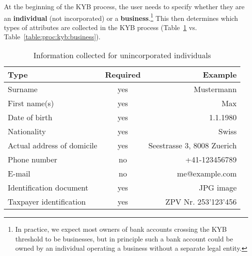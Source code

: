 At the beginning of the KYB process, the user needs to specify whether they
are an {\bf individual} (not incorporated) or a {\bf business}.\footnote{In
practice, we expect most owners of bank accounts crossing the KYB threshold to
be businesses, but in principle such a bank account could be owned by an
individual operating a business without a separate legal entity.}  This then
determines which types of attributes are collected in the KYB process
(Table~\ref{table:proc:kyb:individual}
vs. Table~\ref{table:proc:kyb:business}).

\begin{table}
  \caption{Information collected for unincorporated individuals}
  \label{table:proc:kyb:individual}
  \begin{center}
    \begin{tabular}{l|c|r}
      {\bf Type}                 & {\bf Required}    & {\bf Example} \\ \hline \hline
      Surname                    & yes        & Mustermann \\
      First name(s)              & yes        & Max \\
      Date of birth              & yes        & 1.1.1980 \\
      Nationality                & yes        & Swiss \\
      Actual address of domicile & yes        & Seestrasse 3, 8008 Zuerich \\
      Phone number               & no         & +41-123456789 \\
      E-mail                     & no         & me@example.com \\
      Identification document    & yes        & JPG image \\
      Taxpayer identification    & yes        & ZPV Nr. 253'123'456 \\
  \end{tabular}
  \end{center}
\end{table}


